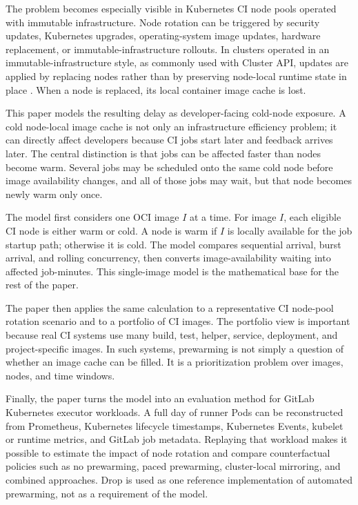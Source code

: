 \documentclass[11pt,a4paper]{article}
\begin{document}
The problem becomes especially visible in Kubernetes CI node pools operated with immutable infrastructure. Node rotation can be triggered by security updates, Kubernetes upgrades, operating-system image updates, hardware replacement, or immutable-infrastructure rollouts. In clusters operated in an immutable-infrastructure style, as commonly used with Cluster API, updates are applied by replacing nodes rather than by preserving node-local runtime state in place \cite{clusterapioverview,clusterapiconcepts}. When a node is replaced, its local container image cache is lost.

This paper models the resulting delay as developer-facing cold-node exposure. A cold node-local image cache is not only an infrastructure efficiency problem; it can directly affect developers because CI jobs start later and feedback arrives later. The central distinction is that jobs can be affected faster than nodes become warm. Several jobs may be scheduled onto the same cold node before image availability changes, and all of those jobs may wait, but that node becomes newly warm only once.

The model first considers one OCI image \(I\) at a time. For image \(I\), each eligible CI node is either warm or cold. A node is warm if \(I\) is locally available for the job startup path; otherwise it is cold. The model compares sequential arrival, burst arrival, and rolling concurrency, then converts image-availability waiting into affected job-minutes. This single-image model is the mathematical base for the rest of the paper.

The paper then applies the same calculation to a representative CI node-pool rotation scenario and to a portfolio of CI images. The portfolio view is important because real CI systems use many build, test, helper, service, deployment, and project-specific images. In such systems, prewarming is not simply a question of whether an image cache can be filled. It is a prioritization problem over images, nodes, and time windows.

Finally, the paper turns the model into an evaluation method for GitLab Kubernetes executor workloads. A full day of runner Pods can be reconstructed from Prometheus, Kubernetes lifecycle timestamps, Kubernetes Events, kubelet or runtime metrics, and GitLab job metadata. Replaying that workload makes it possible to estimate the impact of node rotation and compare counterfactual policies such as no prewarming, paced prewarming, cluster-local mirroring, and combined approaches. Drop is used as one reference implementation of automated prewarming, not as a requirement of the model.
\end{document}
